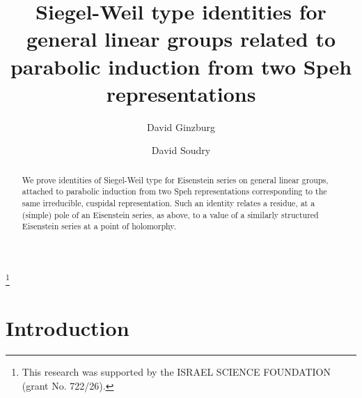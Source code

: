 \documentclass[12pts]{amsart}
\begin{document}
	\renewcommand{\theequation}{\arabic{equation}}
	
	
	\title{Siegel-Weil type identities for general linear groups related to parabolic induction from two Speh representations}
	
	\author{David Ginzburg}
	
	\address{School of Mathematical Sciences, Sackler Faculty of Exact Sciences, Tel-Aviv University, Israel
		69978} 
	
	
	\thanks{This research was supported by the ISRAEL SCIENCE FOUNDATION
		(grant No. 722/26).}
	
	\author{David Soudry}
	\address{School of Mathematical Sciences, Sackler Faculty of Exact Sciences, Tel-Aviv University, Israel
		69978} 
	
	
	
	
	
	\maketitle
	
	\begin{abstract}
		We prove identities of Siegel-Weil type for Eisenstein series on general linear groups, attached to parabolic induction from two Speh representations corresponding to the same irreducible, cuspidal representation. Such an identity relates a residue, at a (simple) pole of an Eisenstein series, as above, to a value of a similarly structured Eisenstein series at a point of holomorphy.
	\end{abstract}
	
	
	
	\section{Introduction}
	
\end{document}

